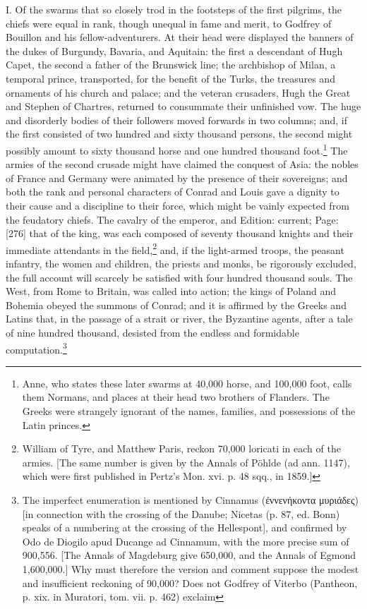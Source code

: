 I. Of the swarms that so closely trod in the footsteps of the first pilgrims, the chiefs were equal in rank, though unequal in fame and merit, to Godfrey of Bouillon and his fellow-adventurers. At their head were displayed the banners of the dukes of Burgundy, Bavaria, and Aquitain: the first a descendant of Hugh Capet, the second a father of the Brunswick line; the archbishop of Milan, a temporal prince, transported, for the benefit of the Turks, the treasures and ornaments of his church and palace; and the veteran crusaders, Hugh the Great and Stephen of Chartres, returned to consummate their unfinished vow. The huge and disorderly bodies of their followers moved forwards in two columns; and, if the first consisted of two hundred and sixty thousand persons, the second might possibly amount to sixty thousand horse and one hundred thousand foot.\footnote{Anne, who states these later swarms at 40,000 horse, and 100,000 foot, calls them Normans, and places at their head two brothers of Flanders. The Greeks were strangely ignorant of the names, families, and possessions of the Latin princes.} The armies of the second crusade might have claimed the conquest of Asia: the nobles of France and Germany were animated by the presence of their sovereigns; and both the rank and personal characters of Conrad and Louis gave a dignity to their cause and a discipline to their force, which might be vainly expected from the feudatory chiefs. The cavalry of the emperor, and Edition: current; Page: [276] that of the king, was each composed of seventy thousand knights and their immediate attendants in the field,\footnote{William of Tyre, and Matthew Paris, reckon 70,000 loricati in each of the armies. [The same number is given by the Annals of Pöhlde (ad ann. 1147), which were first published in Pertz\texthebrew{}’s Mon. xvi. p. 48 sqq., in 1859.]} and, if the light-armed troops, the peasant infantry, the women and children, the priests and monks, be rigorously excluded, the full account will scarcely be satisfied with four hundred thousand souls. The West, from Rome to Britain, was called into action; the kings of Poland and Bohemia obeyed the summons of Conrad; and it is affirmed by the Greeks and Latins that, in the passage of a strait or river, the Byzantine agents, after a tale of nine hundred thousand, desisted from the endless and formidable computation.\footnote{The imperfect enumeration is mentioned by Cinnamus (\textgreek{\texthebrew{ἐ}ννενήκοντα μυριάδες}) [in connection with the crossing of the Danube; Nicetas (p. 87, ed. Bonn) speaks of a numbering at the crossing of the Hellespont], and confirmed by Odo de Diogilo apud Ducange ad Cinnamum, with the more precise sum of 900,556. [The Annals of Magdeburg give 650,000, and the Annals of Egmond 1,600,000.] Why must therefore the version and comment suppose the modest and insufficient reckoning of 90,000? Does not Godfrey of Viterbo (Pantheon, p. xix. in Muratori, tom. vii. p. 462) exclaim

}
